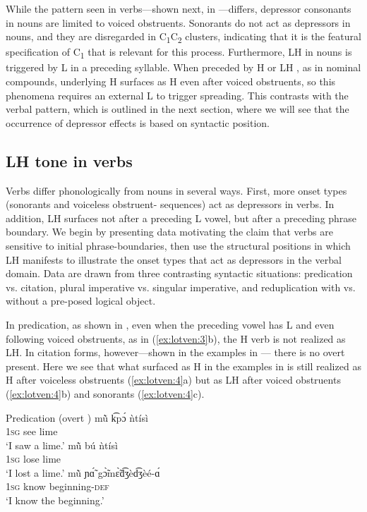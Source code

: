 \documentclass[output=paper,newtxmath,modfonts,nonflat]{langsci/langscibook}
\begin{document}
While the pattern seen in verbs—shown next, in —differs, depressor consonants in nouns are limited to voiced obstruents. Sonorants do not act as depressors in nouns, and they are disregarded in C\textsubscript{1}C\textsubscript{2} clusters, indicating that it is the featural specification of C\textsubscript{1} that is relevant for this process. Furthermore, LH  in nouns is triggered by L  in a preceding syllable. When preceded by H or LH , as in nominal compounds, underlying H surfaces as H even after voiced obstruents, so this phenomena requires an external L  to trigger spreading. This contrasts with the verbal pattern, which is outlined in the next section, where we will see that the occurrence of depressor effects is based on syntactic position.

\subsection{LH tone in verbs}\label{sec:lotven:4.2}

Verbs differ phonologically from nouns in several ways. First, more onset types (sonorants and voiceless obstruent- sequences) act as depressors in verbs. In addition, LH  surfaces not after a preceding L  vowel, but after a preceding phrase boundary. We begin by presenting data motivating the claim that verbs are sensitive to initial phrase-boundaries, then use the structural positions in which LH  manifests to illustrate the onset types that act as depressors in the verbal domain. Data are drawn from three contrasting syntactic situations: predication vs. citation, plural imperative vs. singular imperative, and reduplication with vs. without a pre-posed logical object.

In predication, as shown in , even when the preceding vowel has L  and even following voiced obstruents, as in (\ref{ex:lotven:3}b), the H  verb is not realized as LH. In citation forms, however—shown in the examples in  — there is no overt  present. Here we see that what surfaced as H in the examples in  is still realized as H after voiceless obstruents (\ref{ex:lotven:4}a) but as LH after voiced obstruents (\ref{ex:lotven:4}b) and sonorants (\ref{ex:lotven:4}c).

\ea\label{ex:lotven:3} Predication (overt )
\ea\label{ex:lotven:3a} \gll mũ̀ k͡pɔ́ ǹtísì\\
1\textsc{sg} see lime \\
\glt ‘I saw a lime.’ 
\ex\label{ex:lotven:3b}	\gll mũ̀ bú ǹtísì\\
1\textsc{sg} lose lime\\
\glt ‘I lost a lime.’
\ex\label{ex:lotven:3c} \gll mũ̀ ɲɑ̃́ gɔ̃̀mɛ̃̀d͡ʒèd͡ʒèé-ɑ́\\
1\textsc{sg} know beginning-\textsc{def} \\
\glt ‘I know the beginning.’
\z
\z
\end{document}

